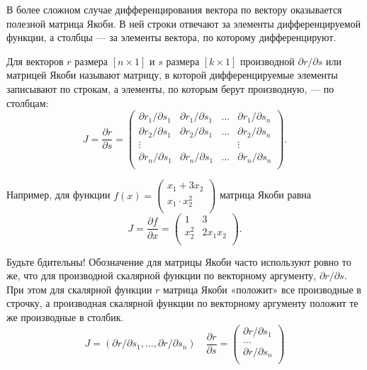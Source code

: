 \documentclass[12pt]{article}
\begin{document}
В более сложном случае дифференцирования вектора по вектору оказывается полезной матрица Якоби.
В ней строки отвечают за элементы дифференцируемой функции, а столбцы — за элементы вектора, по которому дифференцируют. 

\begin{definition}
Для векторов $r$ размера $[n \times 1]$ и $s$ размера $[k \times 1]$ производной $\partial r/\partial s$ или матрицей Якоби называют матрицу, в которой дифференцируемые элементы записывают по строкам, а элементы, по которым берут производную, — по столбцам:
    \[
    J = \frac{\partial r}{\partial s} = \begin{pmatrix}
        \partial r_1/\partial s_1 & \partial r_1/\partial s_1 & \dots & \partial r_1/\partial s_n \\
        \partial r_2/\partial s_1 & \partial r_2/\partial s_1 & \dots & \partial r_2/\partial s_n \\
        \vdots & & & \vdots \\
        \partial r_n/\partial s_1 & \partial r_n/\partial s_1 & \dots & \partial r_n/\partial s_n \\   
    \end{pmatrix}.
    \]
\end{definition}

Например, для функции $f(x) = \begin{pmatrix}
    x_1 + 3x_2 \\
    x_1 \cdot x_2^2  \\
\end{pmatrix}$ матрица Якоби равна
\[
J = \frac{\partial f}{\partial x} = \begin{pmatrix}
    1 & 3 \\
    x_2^2 & 2x_1 x_2 \\
\end{pmatrix}.
\]


Будьте бдительны! 
Обозначение для матрицы Якоби часто используют ровно то же, что для производной скалярной функции по векторному аргументу, $\partial r/\partial s$. 
При этом для скалярной функции $r$ матрица Якоби «положит» все производные в строчку, а производная скалярной функции по векторному аргументу положит те же производные в столбик.
\[
J = (\partial r/\partial s_1, \dots, \partial r/\partial s_n) \quad \frac{\partial r}{\partial s} = \begin{pmatrix}
    \partial r/\partial s_1 \\
    \dots \\
    \partial r/\partial s_n \\
\end{pmatrix}
\]
\end{document}
